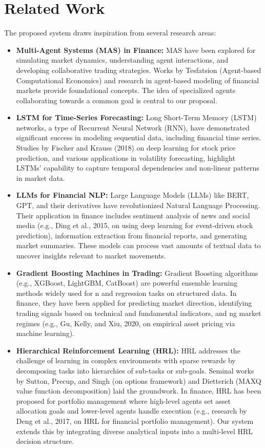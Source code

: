 \documentclass[11pt]{article}
\begin{document}
\section{Related Work}

The proposed system draws inspiration from several research areas:

\begin{itemize}
\item   \textbf{Multi-Agent Systems (MAS) in Finance:} MAS have been explored for simulating market dynamics, understanding agent interactions, and developing collaborative trading strategies. Works by Tesfatsion (Agent-based Computational Economics) and research in agent-based modeling of financial markets provide foundational concepts. The idea of specialized agents collaborating towards a common goal is central to our proposal.

\item   \textbf{LSTM for Time-Series Forecasting:} Long Short-Term Memory (LSTM) networks, a type of Recurrent Neural Network (RNN), have demonstrated significant success in modeling sequential data, including financial time series. Studies by Fischer and Krauss (2018) on deep learning for stock price prediction, and various applications in volatility forecasting, highlight LSTMs' capability to capture temporal dependencies and non-linear patterns in market data.

\item   \textbf{LLMs for Financial NLP:} Large Language Models (LLMs) like BERT, GPT, and their derivatives have revolutionized Natural Language Processing. Their application in finance includes sentiment analysis of news and social media (e.g., Ding et al., 2015, on using deep learning for event-driven stock prediction), information extraction from financial reports, and generating market summaries. These models can process vast amounts of textual data to uncover insights relevant to market movements.

\item   \textbf{Gradient Boosting Machines in Trading:} Gradient Boosting algorithms (e.g., XGBoost, LightGBM, CatBoost) are powerful ensemble learning methods widely used for n and regression tasks on structured data. In finance, they have been applied for predicting market direction, identifying trading signals based on technical and fundamental indicators, and ng market regimes (e.g., Gu, Kelly, and Xiu, 2020, on empirical asset pricing via machine learning).

\item   \textbf{Hierarchical Reinforcement Learning (HRL):} HRL addresses the challenge of learning in complex environments with sparse rewards by decomposing tasks into hierarchies of sub-tasks or sub-goals. Seminal works by Sutton, Precup, and Singh (on options framework) and Dietterich (MAXQ value function decomposition) laid the groundwork. In finance, HRL has been proposed for portfolio management where high-level agents set asset allocation goals and lower-level agents handle execution (e.g., research by Deng et al., 2017, on HRL for financial portfolio management). Our system extends this by integrating diverse analytical inputs into a multi-level HRL decision structure.


\end{itemize}
\end{document}

